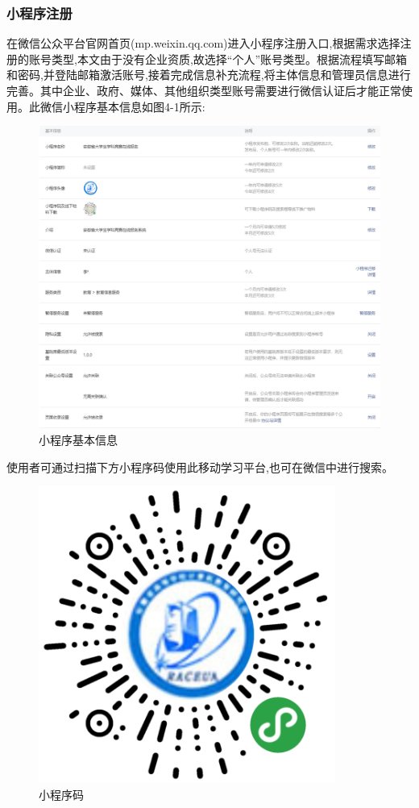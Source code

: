 \documentclass[a4paper]{ltxdoc}
\begin{document}
{		\subsubsection{小程序注册}
		在微信公众平台官网首页(mp.weixin.qq.com)进入小程序注册入口,根据需求选择注册的账号类型,本文由于没有企业资质,故选择“个人”账号类型。根据流程填写邮箱和密码,并登陆邮箱激活账号,接着完成信息补充流程,将主体信息和管理员信息进行完善。其中企业、政府、媒体、其他组织类型账号需要进行微信认证后才能正常使用。此微信小程序基本信息如图4-1所示:
		
		\begin{figure}[!htb]
			\centering
			\includegraphics[width=1.0\linewidth]{images/2.jpg}
			\caption{小程序基本信息}
		\end{figure}
		
		使用者可通过扫描下方小程序码使用此移动学习平台,也可在微信中进行搜索。
		
		\begin{figure}[!htb]
			\centering
			\includegraphics[width=0.5\linewidth]{images/3.jpg}
			\caption{小程序码}
		\end{figure}
		
}
\end{document}
